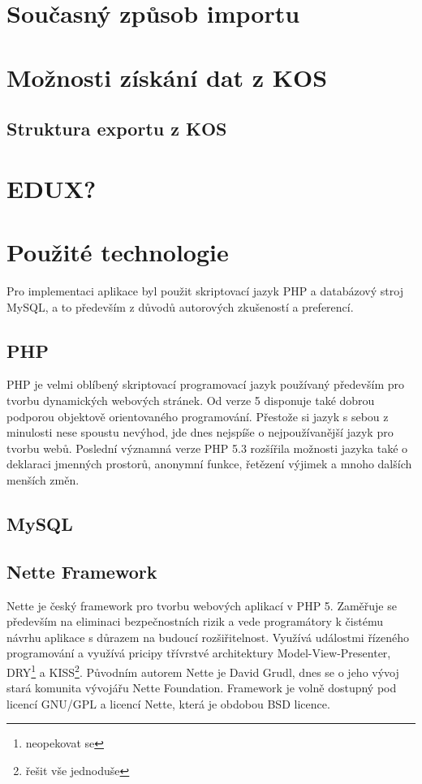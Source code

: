 \documentclass[11pt,oneside,a4paper]{book}
\begin{document}
\section{Současný způsob importu}
\section{Možnosti získání dat z KOS}
\subsection{Struktura exportu z KOS}
\section{EDUX?}
\section{Použité technologie}
Pro implementaci aplikace byl použit skriptovací jazyk PHP a databázový stroj MySQL, a to především z důvodů autorových zkušeností a preferencí.
\subsection{PHP}
PHP je velmi oblíbený skriptovací programovací jazyk používaný především pro tvorbu dynamických webových stránek. Od verze 5 disponuje také dobrou podporou objektově orientovaného programování. Přestože si jazyk s sebou z minulosti nese spoustu nevýhod, jde dnes nejspíše o nejpoužívanější jazyk pro tvorbu webů. Poslední významná verze PHP 5.3 rozšířila možnosti jazyka také o deklaraci jmenných prostorů, anonymní funkce, řetězení výjimek a mnoho dalších menších změn.

\subsection{MySQL}
\subsection{Nette Framework}
Nette je český framework pro tvorbu webových aplikací v PHP 5. Zaměřuje se především na eliminaci bezpečnostních rizik a vede programátory k čistému návrhu aplikace s důrazem na budoucí rozšiřitelnost. Využívá událostmi řízeného programování a využívá pricipy třívrstvé architektury Model-View-Presenter, DRY\footnote{neopekovat se} a KISS\footnote{řešit vše jednoduše}. Původním autorem Nette je David Grudl, dnes se o jeho vývoj stará komunita vývojářu Nette Foundation. Framework je volně dostupný pod licencí GNU/GPL a licencí Nette, která je obdobou BSD licence\cite{nette:licence}.
\end{document}
